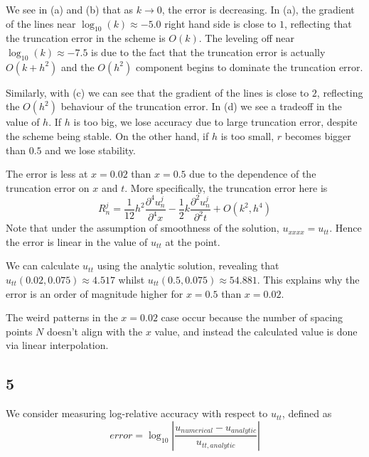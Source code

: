 \documentclass{article}
\numberwithin{equation}{section}
\theoremstyle{definition}
\newcommand{\ppn}[3]{\frac{\partial^{#1} #2}{\partial^{#1} #3}}
\begin{document}
We see in (a) and (b) that as $k \to 0$, the error is decreasing. In (a), the gradient of the lines near $\log_{10}(k) \approx -5.0$ right hand side is close to $1$, reflecting that the truncation error in the scheme is $O(k)$. The leveling off near $\log_{10}(k) \approx -7.5$ is due to the fact that the truncation error is actually $O(k + h^2)$ and the $O(h^2)$ component begins to dominate the truncation error.

Similarly, with (c) we can see that the gradient of the lines is close to $2$, reflecting the $O(h^2)$ behaviour of the truncation error. In (d) we see a tradeoff in the value of $h$. If $h$ is too big, we lose accuracy due to large truncation error, despite the scheme being stable. On the other hand, if $h$ is too small, $r$ becomes bigger than $0.5$ and we lose stability.

The error is less at $x=0.02$ than $x=0.5$ due to the dependence of the truncation error on $x$ and $t$. More specifically, the truncation error here is
\begin{equation}
    R_n^j = \frac 1{12} h^2 \ppn{4}{u_n^j}{x} - \frac 12 k \ppn{2}{u_n^j}{t} + O(k^2, h^4)
\end{equation}
Note that under the assumption of smoothness of the solution, $u_{xxxx} = u_{tt}$. Hence the error is linear in the value of $u_{tt}$ at the point.

We can calculate $u_{tt}$ using the analytic solution, revealing that $u_{tt}(0.02, 0.075) \approx 4.517$ whilst $u_{tt}(0.5, 0.075) \approx 54.881$. This explains why the error is an order of magnitude higher for $x=0.5$ than $x=0.02$.

The weird patterns in the $x=0.02$ case occur because the number of spacing points $N$ doesn't align with the $x$ value, and instead the calculated value is done via linear interpolation.

\subsection{5}
We consider measuring log-relative accuracy with respect to $u_{tt}$, defined as
\begin{equation}
    error = \log_{10}\left| \frac{u_{numerical} - u_{analytic}}{u_{tt,analytic}} \right|
\end{equation}
\end{document}
